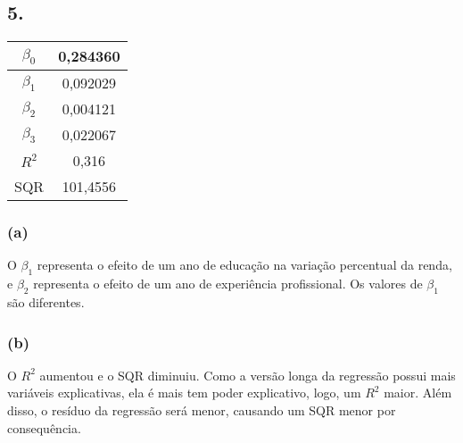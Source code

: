 \documentclass[hidelinks,11pt]{book}
\theoremstyle{definition}
\begin{document}
	\subsection*{5.}

		\begin{center}
	\begin{tabular}{|c|c|}\hline
		$\beta_0$ & 0,284360\\\hline
		$\beta_1$ & 0,092029\\\hline
		$\beta_2$ & 0,004121\\\hline
		$\beta_3$ & 0,022067\\\hline
		$R^2$ & 0,316\\\hline
		SQR & 101,4556\\\hline
	\end{tabular}
\end{center}


\subsubsection{(a)}

O $\beta_1$ representa o efeito de um ano de educação na variação percentual da renda, e $\beta_2$ representa o efeito de um ano de experiência profissional. Os valores de $\beta_1$ são diferentes.


\subsubsection{(b)}

O $R^2$ aumentou e o SQR diminuiu. Como a versão longa da regressão possui mais variáveis explicativas, ela é mais tem poder explicativo, logo, um $R^2$ maior. Além disso, o resíduo da regressão será menor, causando um SQR menor por consequência.
\end{document}
